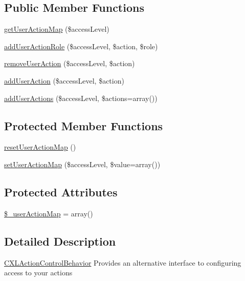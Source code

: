 \subsection*{Public Member Functions}
\begin{DoxyCompactItemize}
\item 
\hyperlink{classCXLActionControlBehavior_add454aad5b6c4da4c505cfddc95b5c28}{getUserActionMap} (\$accessLevel)
\item 
\hyperlink{classCXLActionControlBehavior_a45b0d25829a9c6dc423327ad66d731ab}{addUserActionRole} (\$accessLevel, \$action, \$role)
\item 
\hyperlink{classCXLActionControlBehavior_a94aadec855a8f2a8c11ad692e944fbab}{removeUserAction} (\$accessLevel, \$action)
\item 
\hyperlink{classCXLActionControlBehavior_ad0ba36d866855d0f825be3ee705752dc}{addUserAction} (\$accessLevel, \$action)
\item 
\hyperlink{classCXLActionControlBehavior_a0674340deb38ba1bdd56925fde80857c}{addUserActions} (\$accessLevel, \$actions=array())
\end{DoxyCompactItemize}
\subsection*{Protected Member Functions}
\begin{DoxyCompactItemize}
\item 
\hyperlink{classCXLActionControlBehavior_a7a9cb51ff46e200b6475678ac407a8b5}{resetUserActionMap} ()
\item 
\hyperlink{classCXLActionControlBehavior_ab596b5f38307ae814ca5d0757babf136}{setUserActionMap} (\$accessLevel, \$value=array())
\end{DoxyCompactItemize}
\subsection*{Protected Attributes}
\begin{DoxyCompactItemize}
\item 
\hyperlink{classCXLActionControlBehavior_a7632198654cfa044b1d5f296f634078e}{\$\_\-userActionMap} = array()
\end{DoxyCompactItemize}


\subsection{Detailed Description}
\hyperlink{classCXLActionControlBehavior}{CXLActionControlBehavior} Provides an alternative interface to configuring access to your actions 

